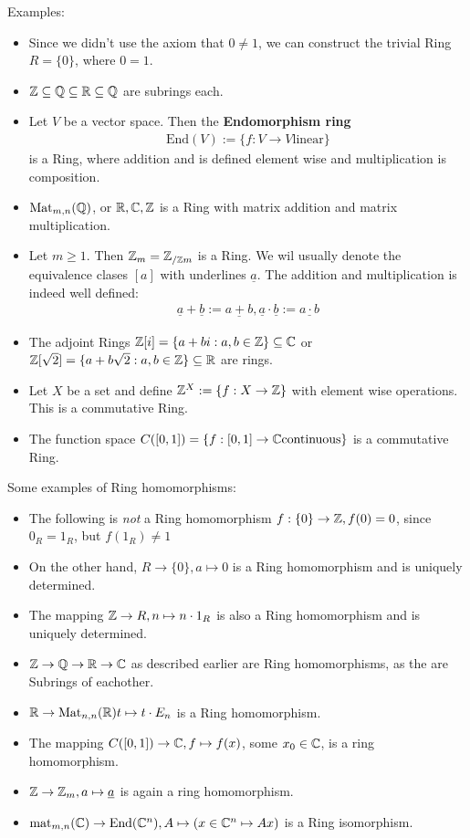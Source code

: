 Examples:
\begin{itemize}
				\item Since we didn't use the axiom that $0 \neq 1$, we can construct the trivial Ring $R = \{0\}$, where $0 = 1$.
				\item $\mathbb{Z} \subseteq \mathbb{Q} \subseteq \mathbb{R} \subseteq \mathbb{Q}$ are subrings each.
				\item	Let $V$ be a vector space. Then the \textbf{Endomorphism ring} 
				\begin{align*}
								\text{End}(V) := \{f: V \to V \text{linear}\}
				\end{align*}
				is a Ring, where addition and is defined element wise and multiplication is composition.
\item $\text{Mat}_{m,n}(\mathbb{Q})$, or $\mathbb{R}, \mathbb{C}, \mathbb{Z}$ is a Ring with matrix addition and matrix multiplication.
\item Let $m \geq 1$. Then $\mathbb{Z}_m = \mathbb{Z}_{/\mathbb{Z} m}$ is a Ring. We wil usually denote the equivalence clases $[a]$ with underlines $\underline{a}$. The addition and multiplication is indeed well defined:
				\begin{align*}
					\underline{a} + \underline{b}  := \underline{a + b}, \underline{a}  \cdot  \underline{b} := \underline{a \cdot  b} 
				\end{align*}
\item The adjoint Rings $\mathbb{Z}[i] = \{a + bi: a,b \in \mathbb{Z}\} \subseteq \mathbb{C}$ or $\mathbb{Z}[\sqrt{2}] = \{a + b \sqrt{2}: a,b \in \mathbb{Z}\} \subseteq \mathbb{R}$ are rings.
				\item Let $X$ be a set and define	$\mathbb{Z}^X := \{f: X \to \mathbb{Z}\}$
					with element wise operations. This is a commutative Ring.
	\item The function space $C([0,1]) = \{f: [0,1] \to \mathbb{C} \text{continuous}\}$ is a commutative Ring. 
\end{itemize}


Some examples of Ring homomorphisms:
\begin{itemize}
				\item The following is \emph{not} a Ring homomorphism $f: \{0\} \to \mathbb{Z}, f(0) = 0$, since $0_R = 1_R$, but $f(1_R) \neq 1$
				\item On the other hand, $R \to \{0\}, a \mapsto 0$ is a Ring homomorphism and is uniquely determined.
				\item The mapping $\mathbb{Z} \to R, n \mapsto n \cdot 1_R$ is also a Ring homomorphism and is uniquely determined.
				\item $\mathbb{Z} \to  \mathbb{Q} \to \mathbb{R} \to \mathbb{C}$ as described earlier are Ring homomorphisms, as the are Subrings of eachother.
				\item $\mathbb{R} \to \text{Mat}_{n,n}(\mathbb{R}) t \mapsto t \cdot E_n$ is a Ring homomorphism.
				\item The mapping $C([0,1]) \to \mathbb{C}, f \mapsto f(x)$, some $x_0 \in \mathbb{C}$, is a ring homomorphism.
				\item $\mathbb{Z} \to \mathbb{Z}_m, a \mapsto \underline{a}$ is again a ring homomorphism.
				\item $\text{mat}_{m,n}(\mathbb{C}) \to \text{End}(\mathbb{C}^n), A \mapsto \left(x \in \mathbb{C}^n \mapsto Ax\right)$ is a Ring isomorphism.
\end{itemize}



